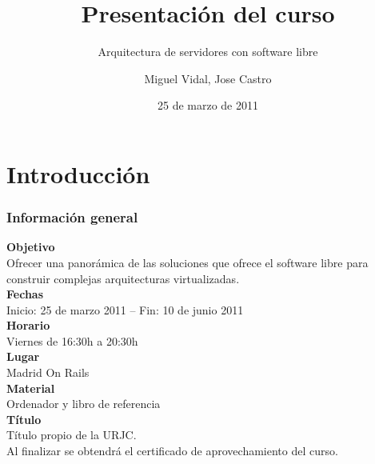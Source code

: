 \documentclass{beamer}
\begin{document}
\title{Presentación del curso}
\subtitle{Arquitectura de servidores con software libre}
\author{Miguel Vidal, Jose Castro}
\date{25 de marzo de 2011}



\section{Introducción}

\begin{frame}
\frametitle{Información general}
\textbf{Objetivo}\\
Ofrecer una panorámica de las soluciones que ofrece el software libre para construir complejas arquitecturas virtualizadas.\\
\textbf{Fechas}\\
Inicio: 25 de marzo 2011 -- Fin: 10 de junio 2011\\
\textbf{Horario}\\
Viernes de 16:30h a 20:30h\\
\textbf{Lugar}\\
Madrid On Rails\\
\textbf{Material}\\
Ordenador y libro de referencia\\
\textbf{Título}\\
Título propio de la URJC.\\
Al finalizar se obtendrá el certificado de aprovechamiento del curso.
\end{frame}
\end{document}
